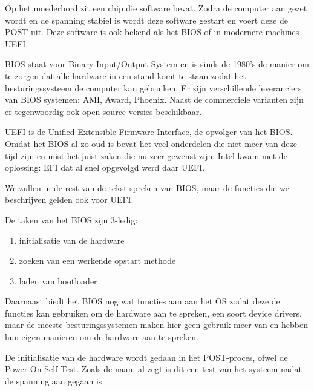Op het moederbord zit een chip die software bevat. Zodra de computer aan gezet wordt en de spanning stabiel is wordt deze software gestart en voert deze de POST uit. Deze software is ook bekend als het BIOS of in modernere machines UEFI.

BIOS staat voor Binary Input/Output System en is sinds de 1980's de manier om te zorgen dat alle hardware in een stand komt te staan zodat het besturingssysteem de computer kan gebruiken. Er zijn verschillende leveranciers van BIOS systemen: AMI, Award, Phoenix. Naast de commerciele varianten zijn er tegenwoordig ook open source versies beschikbaar.

UEFI is de Unified Extensible Firmware Interface, de opvolger van het BIOS. Omdat het BIOS al zo oud is bevat het veel onderdelen die niet meer van deze tijd zijn en mist het juist zaken die nu zeer gewenst zijn. Intel kwam met de oplossing: EFI dat al snel opgevolgd werd daar UEFI.

We zullen in de rest van de tekst spreken van BIOS, maar de functies die we beschrijven gelden ook voor UEFI.

De taken van het BIOS zijn 3-ledig:
\begin{enumerate}
\item initialisatie van de hardware
\item zoeken van een werkende opstart methode
\item laden van bootloader
\end{enumerate}

Daarnaast biedt het BIOS nog wat functies aan aan het OS zodat deze de functies kan gebruiken om de hardware aan te spreken, een soort device drivers, maar de meeste besturingssystemen maken hier geen gebruik meer van en hebben hun eigen manieren om de hardware aan te spreken.

De initialisatie van de hardware wordt gedaan in het POST-proces, ofwel de Power On Self Test. Zoals de naam al zegt is dit een test van het systeem nadat de spanning aan gegaan is.
